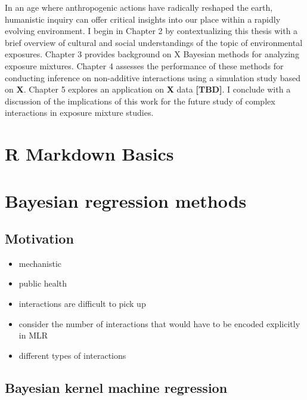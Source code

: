 \documentclass[12pt, twoside]{amherstthesis}
\providecommand{\tightlist}{%
  \setlength{\itemsep}{0pt}\setlength{\parskip}{0pt}}
\begin{document}
In an age where anthropogenic actions have radically reshaped the earth, humanistic inquiry can offer critical insights into our place within a rapidly evolving environment. I begin in Chapter 2 by contextualizing this thesis with a brief overview of cultural and social understandings of the topic of environmental exposures. Chapter 3 provides background on X Bayesian methods for analyzing exposure mixtures. Chapter 4 assesses the performance of these methods for conducting inference on non-additive interactions using a simulation study based on \textbf{X}. Chapter 5 explores an application on \textbf{X} data \textbf{{[}TBD{]}}. I conclude with a discussion of the implications of this work for the future study of complex interactions in exposure mixture studies.

\hypertarget{rmd-basics}{%
\chapter{R Markdown Basics}\label{rmd-basics}}

\hypertarget{bayes}{%
\chapter{Bayesian regression methods}\label{bayes}}

\hypertarget{motivation}{%
\section{Motivation}\label{motivation}}
\begin{itemize}
\tightlist
\item
  mechanistic
\item
  public health
\item
  interactions are difficult to pick up
\item
  consider the number of interactions that would have to be encoded explicitly in MLR
\item
  different types of interactions
\end{itemize}
\hypertarget{bayesian-kernel-machine-regression}{%
\section{Bayesian kernel machine regression}\label{bayesian-kernel-machine-regression}}
\end{document}
